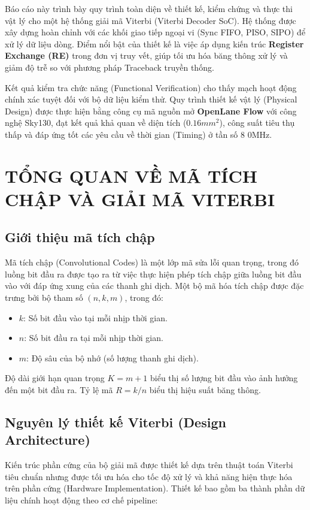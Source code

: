 \documentclass[12pt,a4paper]{report}
\begin{document}
Báo cáo này trình bày quy trình toàn diện về thiết kế, kiểm chứng và thực thi vật lý cho một hệ thống giải mã Viterbi (Viterbi Decoder SoC). Hệ thống được xây dựng hoàn chỉnh với các khối giao tiếp ngoại vi (Sync FIFO, PISO, SIPO) để xử lý dữ liệu dòng. Điểm nổi bật của thiết kế là việc áp dụng kiến trúc \textbf{Register Exchange (RE)} trong đơn vị truy vết, giúp tối ưu hóa băng thông xử lý và giảm độ trễ so với phương pháp Traceback truyền thống.

Kết quả kiểm tra chức năng (Functional Verification) cho thấy mạch hoạt động chính xác tuyệt đối với bộ dữ liệu kiểm thử. Quy trình thiết kế vật lý (Physical Design) được thực hiện bằng công cụ mã nguồn mở \textbf{OpenLane Flow} với công nghệ Sky130, đạt kết quả khả quan về diện tích ($0.16 mm^2$), công suất tiêu thụ thấp và đáp ứng tốt các yêu cầu về thời gian (Timing) ở tần số 8
0MHz.

\newpage
\tableofcontents
\newpage

\listoffigures
\listoftables
\newpage

\chapter{TỔNG QUAN VỀ MÃ TÍCH CHẬP VÀ GIẢI MÃ VITERBI}

\section{Giới thiệu mã tích chập}
Mã tích chập (Convolutional Codes) là một lớp mã sửa lỗi quan trọng, trong đó luồng bit đầu ra được tạo ra từ việc thực hiện phép tích chập giữa luồng bit đầu vào với đáp ứng xung của các thanh ghi dịch. Một bộ mã hóa tích chập được đặc trưng bởi bộ tham số $(n, k, m)$, trong đó:
\begin{itemize}
    \item $k$: Số bit đầu vào tại mỗi nhịp thời gian.
    \item $n$: Số bit đầu ra tại mỗi nhịp thời gian.
    \item $m$: Độ sâu của bộ nhớ (số lượng thanh ghi dịch).
\end{itemize}
Độ dài giới hạn quan trọng $K = m + 1$ biểu thị số lượng bit đầu vào ảnh hưởng đến một bit đầu ra. Tỷ lệ mã $R = k/n$ biểu thị hiệu suất băng thông.

\section{Nguyên lý thiết kế Viterbi (Design Architecture)}
Kiến trúc phần cứng của bộ giải mã được thiết kế dựa trên thuật toán Viterbi tiêu chuẩn nhưng được tối ưu hóa cho tốc độ xử lý và khả năng hiện thực hóa trên phần cứng (Hardware Implementation). Thiết kế bao gồm ba thành phần dữ liệu chính hoạt động theo cơ chế pipeline:
\end{document}
